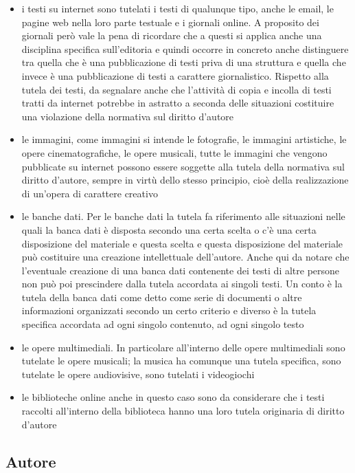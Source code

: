 \begin{itemize}
    \item i testi su internet sono tutelati i testi di qualunque tipo, anche le email, le pagine web nella loro parte testuale e i giornali online. A proposito dei giornali però vale la pena di ricordare che a questi si applica anche una disciplina specifica sull'editoria e quindi occorre in concreto anche distinguere tra quella che è una pubblicazione di testi priva di una struttura e quella che invece è una pubblicazione di testi a carattere giornalistico. Rispetto alla tutela dei testi, da segnalare anche che l'attività di copia e incolla di testi tratti da internet potrebbe in astratto a seconda delle situazioni costituire una violazione della normativa sul diritto d'autore
    \item le immagini, come immagini si intende le fotografie, le immagini artistiche, le opere cinematografiche, le opere musicali, tutte le immagini che vengono pubblicate su internet possono essere soggette alla tutela della normativa sul diritto d'autore, sempre in virtù dello stesso principio, cioè della realizzazione di un'opera di carattere creativo
    \item le banche dati. Per le banche dati la tutela fa riferimento alle situazioni nelle quali la banca dati è disposta secondo una certa scelta o c'è una certa disposizione del materiale e questa scelta e questa disposizione del materiale può costituire una creazione intellettuale dell'autore. Anche qui da notare che l'eventuale creazione di una banca dati contenente dei testi di altre persone non può poi prescindere dalla tutela accordata ai singoli testi. Un conto è la tutela della banca dati come detto come serie di documenti o altre informazioni organizzati secondo un certo criterio e diverso è la tutela specifica accordata ad ogni singolo contenuto, ad ogni singolo testo
    \item le opere multimediali. In particolare all'interno delle opere multimediali sono tutelate le opere musicali; la musica ha comunque una tutela specifica, sono tutelate le opere audiovisive, sono tutelati i videogiochi
    \item le biblioteche online anche in questo caso sono da considerare che i testi raccolti all'interno della biblioteca hanno una loro tutela originaria di diritto d'autore
\end{itemize}

\subsection{Autore}

